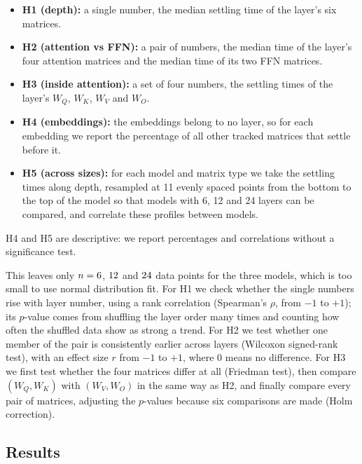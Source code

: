 \documentclass[11pt]{article}
\newcommand{\Wq}{W_Q}
\newcommand{\Wk}{W_K}
\newcommand{\Wv}{W_V}
\newcommand{\Wo}{W_O}
\begin{document}
\begin{itemize}\itemsep0pt \parskip0pt
\item \textbf{H1 (depth):} a single number, the median settling time of the
  layer's six matrices.
\item \textbf{H2 (attention vs FFN):} a pair of numbers, the median time of the
  layer's four attention matrices and the median time of its two FFN
  matrices.
\item \textbf{H3 (inside attention):} a set of four numbers, the settling times
  of the layer's $\Wq$, $\Wk$, $\Wv$ and $\Wo$.
\item \textbf{H4 (embeddings):} the embeddings belong to no layer, so for each
  embedding we report the percentage of all other tracked matrices that settle
  before it.
\item \textbf{H5 (across sizes):} for each model and matrix type we take the
settling times along depth, resampled at 11 evenly spaced points from the
bottom to the top of the model so that models with 6, 12 and 24 layers can
be compared, and correlate these profiles between models.
\end{itemize}

H4 and H5 are descriptive: we report percentages and correlations without a
significance test.

This leaves only $n = 6$, $12$ and $24$ data points
for the three models, which is too small to use normal distribution fit. For H1 we check whether the single numbers rise with
layer number, using a rank correlation (Spearman's $\rho$, from $-1$ to $+1$);
its $p$-value comes from shuffling the layer order many times and counting how
often the shuffled data show as strong a trend. For H2 we test whether one
member of the pair is consistently earlier across layers (Wilcoxon
signed-rank test), with an effect size $r$ from $-1$ to $+1$, where 0 means no
difference. For H3 we first test whether the four matrices differ at all
(Friedman test), then compare $(\Wq,\Wk)$ with $(\Wv,\Wo)$ in the same way as
H2, and finally compare every pair of matrices, adjusting the $p$-values
because six comparisons are made (Holm correction).

\subsection{Results}
\label{sec:results-p1}
\end{document}
